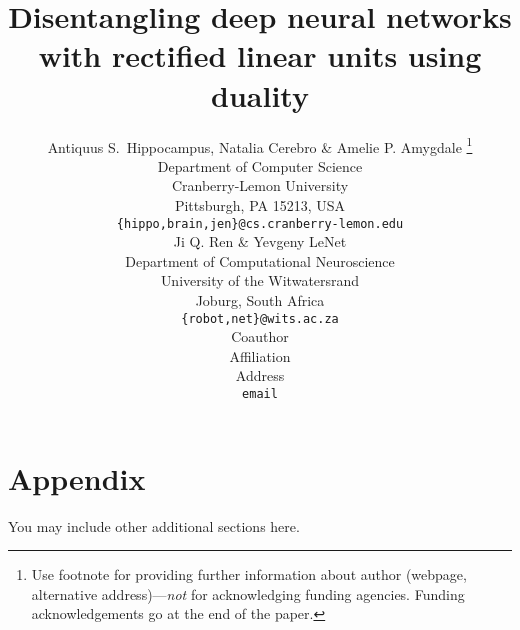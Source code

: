 \documentclass{article} %
\title{Disentangling deep neural networks with rectified linear units using duality}
\author{Antiquus S.~Hippocampus, Natalia Cerebro \& Amelie P. Amygdale \thanks{ Use footnote for providing further information
about author (webpage, alternative address)---\emph{not} for acknowledging
funding agencies.  Funding acknowledgements go at the end of the paper.} \\
Department of Computer Science\\
Cranberry-Lemon University\\
Pittsburgh, PA 15213, USA \\
\texttt{\{hippo,brain,jen\}@cs.cranberry-lemon.edu} \\
\And
Ji Q. Ren \& Yevgeny LeNet \\
Department of Computational Neuroscience \\
University of the Witwatersrand \\
Joburg, South Africa \\
\texttt{\{robot,net\}@wits.ac.za} \\
\AND
Coauthor \\
Affiliation \\
Address \\
\texttt{email}
}
\begin{document}
\maketitle





%






\appendix
\section{Appendix}

You may include other additional sections here.
\end{document}
